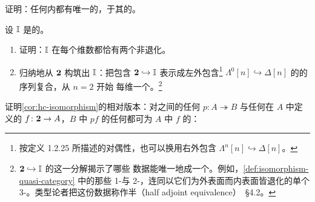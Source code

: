 \begin{exercise}\label{ex:unique-fillers}
证明：任何内\trHorn{}都有唯一\trFiller{}的\trQuasiCategory{}，\trIsomorphism{}于其\trHomotopyCategory{}的\trNerve{}。
\end{exercise}

\begin{exercise}\label{ex:free-living-isomorphism}
设 $\mathbb{I}$ 是\trFreeLivingIsomorphism{}的\trNerve{}。
\begin{enumerate}[label=(\roman*)]
\item 证明：$\mathbb{I}$ 在每个维数都恰有两个非退化\trSimplex{}。
\item 归纳地从 $\mathbf{2}$ 构筑出 $\mathbb{I}$：把包含
$\mathbf{2}\hookrightarrow\mathbb{I}$ 表示成左外\trHorn{}包含\footnote{按定义 1.2.25
所描述的对偶性，也可以换用右外\trHorn{}包含 $\Lambda^n[n]\hookrightarrow\Delta[n]$。}
$\Lambda^0[n]\hookrightarrow\Delta[n]$ 的\trPushout{}的序列复合，从 $n=2$ 开始
每维一个。\footnote{$\mathbf{2}\hookrightarrow\mathbb{I}$ 的这一分解揭示了哪些
数据能\trHomotopy{}唯一地\trExtension{}成一个\trHomotopyCoherentIsomorphism{}。例如，\cref{def:isomorphism-quasi-category}
中的那些 1-\trSimplex{}与 2-\trSimplex{}，连同以它们为外表面而内表面皆退化的单个
3-\trSimplex{}。\trHomotopy{}类型论者把这份数据称作半\trAdjunction\trEquivalence{}（half adjoint
equivalence）\cite{bib125}~\S4.2。}
\end{enumerate}
\end{exercise}

\begin{exercise}\label{ex:relative-hc-isomorphism}
证明\cref{cor:hc-isomorphism}的相对版本：对\trQuasiCategory{}之间的任何\trIsofibration
$p\colon A\twoheadrightarrow B$ 与任何在 $A$ 中定义\trIsomorphism{}的
$f\colon\mathbf{2}\to A$，$B$ 中\trExtension{} $pf$ 的任何\trHomotopyCoherentIsomorphism{}都可\trLifting{}为 $A$
中\trExtension{} $f$ 的\trHomotopyCoherentIsomorphism{}：
\begin{center}
\end{center}
\end{exercise}


